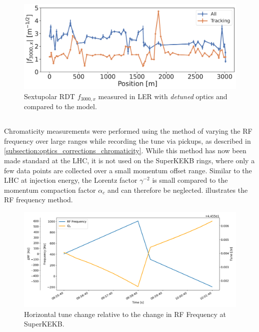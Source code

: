 \begin{figure}[!htb]
    \centering
    \includegraphics[width=0.8\linewidth]{images/kek/f3000x_LER.pdf}
    \caption{Sextupolar RDT $f_{3000,x}$ measured in LER with \textit{detuned} optics and compared
    to the model.}
    \label{fig:kek:rdt_f3000x_LER}
\end{figure}



\FloatBarrier
\subsection{}

Chromaticity measurements were performed using the method of varying the RF frequency over large ranges while
recording the tune via pickups, as described in \cref{subsection:optics_corrections_chromaticity}. While this method has now been made standard at the LHC, it
is not used on the SuperKEKB rings, where only a few data points are collected over a small momentum offset range.
Similar to the LHC at injection energy, the Lorentz
factor $\gamma^{-2}$ is small compared to the momentum compaction factor $\alpha_c$ and can
therefore be neglected.
 illustrates the RF frequency method.

\begin{figure}[!htb]
    \centering
    \includegraphics[width=0.8\linewidth]{images/kek/rf_qx.png}
    \caption{Horizontal tune change relative to the change in RF Frequency at SuperKEKB.}
    \label{fig:kek:chroma_procedure}
\end{figure}

